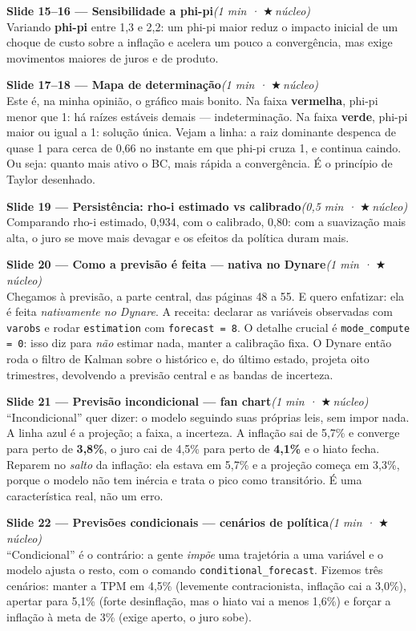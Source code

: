 \documentclass[11pt,a4paper]{article}
\newcommand{\slide}[3]{\medskip\noindent{\color{azul}\rule{3pt}{14pt}}\;
  \textbf{Slide #1 --- #2}\hfill\textit{(#3)}\\[1mm]}
\newcommand{\nucleo}{{\color{verdee}\footnotesize$\bigstar$\,núcleo}}
\begin{document}
\slide{15--16}{Sensibilidade a phi-pi}{1 min · \nucleo}
Variando \textbf{phi-pi} entre 1,3 e 2,2: um phi-pi maior reduz o impacto inicial de um choque de custo
sobre a inflação e acelera um pouco a convergência, mas exige movimentos maiores de juros e de produto.

\slide{17--18}{Mapa de determinação}{1 min · \nucleo}
Este é, na minha opinião, o gráfico mais bonito. Na faixa \textbf{vermelha}, phi-pi menor que 1: há
raízes estáveis demais --- indeterminação. Na faixa \textbf{verde}, phi-pi maior ou igual a 1: solução
única. Vejam a linha: a raiz dominante despenca de quase 1 para cerca de 0,66 no instante em que phi-pi
cruza 1, e continua caindo. Ou seja: quanto mais ativo o BC, mais rápida a convergência. É o princípio
de Taylor desenhado.

\slide{19}{Persistência: rho-i estimado vs calibrado}{0,5 min · \nucleo}
Comparando rho-i estimado, 0,934, com o calibrado, 0,80: com a suavização mais alta, o juro se move
mais devagar e os efeitos da política duram mais.

\slide{20}{Como a previsão é feita --- nativa no Dynare}{1 min · \nucleo}
Chegamos à previsão, a parte central, das páginas 48 a 55. E quero enfatizar: ela é feita
\emph{nativamente no Dynare}. A receita: declarar as variáveis observadas com \texttt{varobs} e rodar
\texttt{estimation} com \texttt{forecast = 8}. O detalhe crucial é \texttt{mode\_compute = 0}: isso diz
para \emph{não} estimar nada, manter a calibração fixa. O Dynare então roda o filtro de Kalman sobre o
histórico e, do último estado, projeta oito trimestres, devolvendo a previsão central e as bandas de
incerteza.

\slide{21}{Previsão incondicional --- fan chart}{1 min · \nucleo}
``Incondicional'' quer dizer: o modelo seguindo suas próprias leis, sem impor nada. A linha azul é a
projeção; a faixa, a incerteza. A inflação sai de 5,7\% e converge para perto de \textbf{3,8\%}, o juro
cai de 4,5\% para perto de \textbf{4,1\%} e o hiato fecha. Reparem no \emph{salto} da inflação: ela
estava em 5,7\% e a projeção começa em 3,3\%, porque o modelo não tem inércia e trata o pico como
transitório. É uma característica real, não um erro.

\slide{22}{Previsões condicionais --- cenários de política}{1 min · \nucleo}
``Condicional'' é o contrário: a gente \emph{impõe} uma trajetória a uma variável e o modelo ajusta o
resto, com o comando \texttt{conditional\_forecast}. Fizemos três cenários: manter a TPM em 4,5\%
(levemente contracionista, inflação cai a 3,0\%), apertar para 5,1\% (forte desinflação, mas o hiato
vai a menos 1,6\%) e forçar a inflação à meta de 3\% (exige aperto, o juro sobe).
\end{document}
